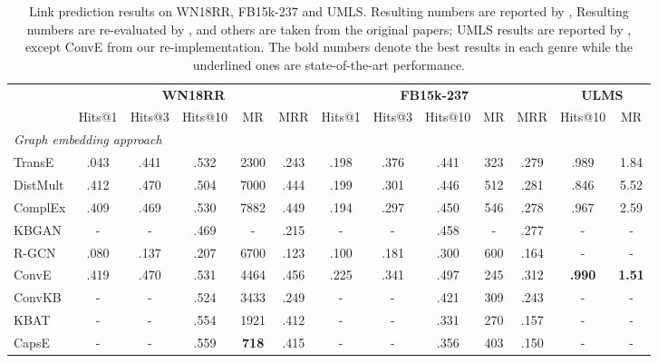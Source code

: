 \documentclass[sigconf]{acmart}
\begin{document}
\begin{table*}[t]
\caption{\small Link prediction results on WN18RR, FB15k-237 and UMLS. 
		Resulting numbers are reported by \citet{nathani2019attention-based}, Resulting numbers are re-evaluated by \cite{re-evaluation}, and others are taken from the original papers; UMLS results are reported by \citet{yao2019kgbert}, except ConvE from our re-implementation. 
		The bold numbers denote the best results in each genre while the underlined ones are state-of-the-art performance. 
	}
    \setlength{\tabcolsep}{3pt}
	\centering
	\begin{tabular}{l|ccccc|ccccc|cc}  \hline
	        & \multicolumn{5}{c|}{\textbf{WN18RR}}           & \multicolumn{5}{c|}{\textbf{FB15k-237}}    & \multicolumn{2}{c}{\textbf{ULMS}}      \\ \cline{2-6} \cline{7-11} \cline{12-13} 
	        & Hits@1   & Hits@3   & Hits@10           & MR          & MRR  & Hits@1     & Hits@3     & Hits@10      & MR  & MRR & Hits@10 & MR \\ \hline \hline\hline
		\multicolumn{7}{l}{\textit{Graph embedding approach}}\\ \hline
		TransE \cite{TransE}   & .043   & .441   & .532          & 2300        & .243 & .198    &.376   &.441   &323    &.279 & .989 & 1.84 \\  
		DistMult \cite{yang2014DistMult} & .412   & .470   & .504          & 7000        & .444 & .199    &.301   &.446   &512    &.281 & .846 & 5.52 \\
		ComplEx \cite{ComplEx} & .409   & .469   & .530          & 7882        & .449 & .194    &.297   &.450   &546    &.278 & .967 & 2.59 \\ 
		KBGAN \cite{cai2017kbgan}        & -      & -      & .469          & -           & .215 & -      & -      & .458    & -   & .277  & - & - \\
		R-GCN \cite{R-GCN}  & .080   & .137   & .207  & 6700    & .123 & .100    &.181   &.300   &600    &.164 & - & - \\
		ConvE \cite{ConvE}     & .419   & .470   & .531          & 4464        & .456 & .225    & .341  & .497  &245   & .312   & \textbf{.990} & \textbf{1.51} \\
		ConvKB \cite{nguyen2017ConvKB} & - & - & .524 &3433 &.249 & - & - &.421 &309 &.243 & - & - \\ 
		KBAT \cite{nathani2019attention-based}    & -  & - &.554 &1921 &.412   & - & - &.331 &270 &.157 & - & -\\
		CapsE \cite{vu2019CapsE} & - & - &.559 &\textbf{718} &.415 & - & - &.356 &403 &.150 & - & -\\ 

\end{tabular}
\end{table*}
\end{document}

